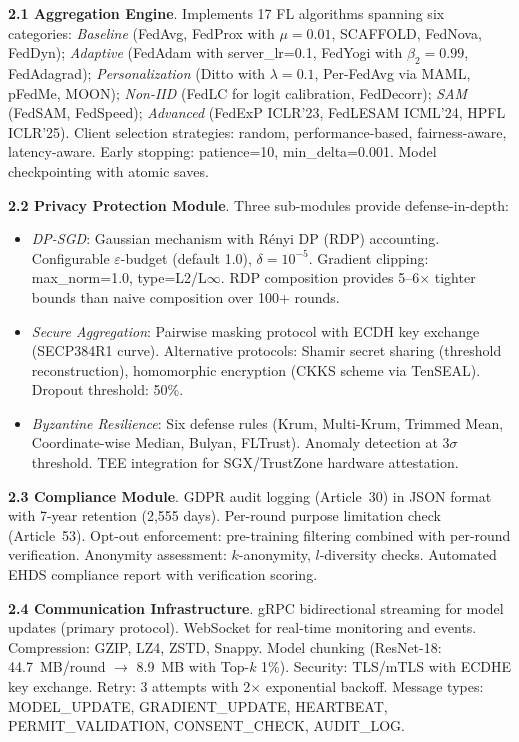 \documentclass[conference,a4paper]{IEEEtran}
\begin{document}
\textbf{2.1 Aggregation Engine}. Implements 17 FL algorithms spanning six categories: \textit{Baseline} (FedAvg, FedProx with $\mu{=}0.01$, SCAFFOLD, FedNova, FedDyn); \textit{Adaptive} (FedAdam with server\_lr=0.1, FedYogi with $\beta_2{=}0.99$, FedAdagrad); \textit{Personalization} (Ditto with $\lambda{=}0.1$, Per-FedAvg via MAML, pFedMe, MOON); \textit{Non-IID} (FedLC for logit calibration, FedDecorr); \textit{SAM} (FedSAM, FedSpeed); \textit{Advanced} (FedExP ICLR'23, FedLESAM ICML'24, HPFL ICLR'25). Client selection strategies: random, performance-based, fairness-aware, latency-aware. Early stopping: patience=10, min\_delta=0.001. Model checkpointing with atomic saves.

\textbf{2.2 Privacy Protection Module}. Three sub-modules provide defense-in-depth:
\begin{itemize}
    \item \textit{DP-SGD}: Gaussian mechanism with R\'enyi DP (RDP) accounting. Configurable $\varepsilon$-budget (default 1.0), $\delta{=}10^{-5}$. Gradient clipping: max\_norm=1.0, type=L2/L$\infty$. RDP composition provides 5--6$\times$ tighter bounds than naive composition over 100+ rounds.
    \item \textit{Secure Aggregation}: Pairwise masking protocol with ECDH key exchange (SECP384R1 curve). Alternative protocols: Shamir secret sharing (threshold reconstruction), homomorphic encryption (CKKS scheme via TenSEAL). Dropout threshold: 50\%.
    \item \textit{Byzantine Resilience}: Six defense rules (Krum, Multi-Krum, Trimmed Mean, Coordinate-wise Median, Bulyan, FLTrust). Anomaly detection at 3$\sigma$ threshold. TEE integration for SGX/TrustZone hardware attestation.
\end{itemize}

\textbf{2.3 Compliance Module}. GDPR audit logging (Article~30) in JSON format with 7-year retention (2,555 days). Per-round purpose limitation check (Article~53). Opt-out enforcement: pre-training filtering combined with per-round verification. Anonymity assessment: $k$-anonymity, $l$-diversity checks. Automated EHDS compliance report with verification scoring.

\textbf{2.4 Communication Infrastructure}. gRPC bidirectional streaming for model updates (primary protocol). WebSocket for real-time monitoring and events. Compression: GZIP, LZ4, ZSTD, Snappy. Model chunking (ResNet-18: 44.7~MB/round $\to$ 8.9~MB with Top-$k$ 1\%). Security: TLS/mTLS with ECDHE key exchange. Retry: 3 attempts with 2$\times$ exponential backoff. Message types: MODEL\_UPDATE, GRADIENT\_UPDATE, HEARTBEAT, PERMIT\_VALIDATION, CONSENT\_CHECK, AUDIT\_LOG.
\end{document}
